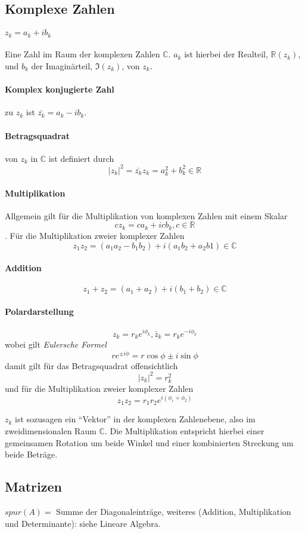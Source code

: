 \documentclass[oneside]{book}
\theoremstyle{definition}
\newcommand\setC{\mathbb C}
\newcommand\setR{\mathbb R}
\renewcommand{\Re}{\mathbb{R}}
\begin{document}
\subsection{Komplexe Zahlen}

\paragraph{$z_k = a_k + i b_k$} Eine Zahl im Raum der komplexen Zahlen $\setC$. $a_k$ ist hierbei der Realteil, $\Re(z_k)$, und $b_k$ der Imaginärteil, $\Im(z_k)$, von $z_k$.
\paragraph{Komplex konjugierte Zahl} zu $z_k$ ist $\bar{z_k} = a_k - i b_k$.
\paragraph{Betragsquadrat} von $z_k$ in $\setC$ ist definiert durch $$|z_k|^2 = \bar{z_k} z_k = a_k^2 + b_k^2 \in \setR$$
\paragraph{Multiplikation} Allgemein gilt für die Multiplikation von komplexen Zahlen mit einem Skalar $$c z_k = c a_k + i c b_k, c \in \setR$$. Für die Multiplikation zweier komplexer Zahlen $$z_1 z_2 = (a_1 a_2-b_1b_2) + i(a_1b_2+a_2b1) \in \setC$$
\paragraph{Addition} $$z_1 + z_2 = (a_1 + a_2) + i(b_1 + b_2) \in \setC$$

\paragraph{Polardarstellung}
$$z_k = r_k e^{i \phi_k}, \bar z_k = r_k e^{-i\phi_k}$$
wobei gilt \textit{Eulersche Formel}
$$r e^{\pm i \phi} = r \cos\phi \pm i \sin\phi$$
damit gilt für das Betragsquadrat offensichtlich
$$|z_k|^2 = r_k^2$$
und für die Multiplikation zweier komplexer Zahlen
$$z_1 z_2 = r_1 r_2 e^{i (\phi_1 + \phi_2)}$$

$z_k$ ist sozusagen ein "`Vektor"' in der komplexen Zahlenebene, also im zweidimensionalen Raum $\setC$. Die Multiplikation entspricht hierbei einer gemeinsamen Rotation um beide Winkel und einer kombinierten Streckung um beide Beträge.  

\subsection{Matrizen}
$spur(A) = $ Summe der Diagonaleinträge, weiteres (Addition, Multiplikation und Determinante): siehe Lineare Algebra.
\end{document}
